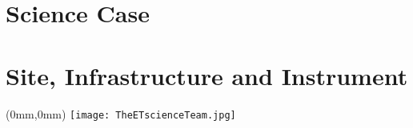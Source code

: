 \documentclass[url,11pt,fleqn]{book} %
\begin{document}

\part{Science Case}
\part{Site, Infrastructure and Instrument}
\label{part:Instrumental}





\appendix





\clearpage %
{}

{}
 
%

\clearpage
\listoffigures
\clearpage
\listoftables
\clearpage
{}
\newpage

\printnomenclature[0.75in] 
\newpage

\newpage 
%
\FloatBarrier
%
%
\pagestyle{empty}
\begin{textblock*}{297mm}(0mm,0mm)   \texttt{[image: TheETscienceTeam.jpg]}
\end{textblock*}
\newpage
\end{document}
